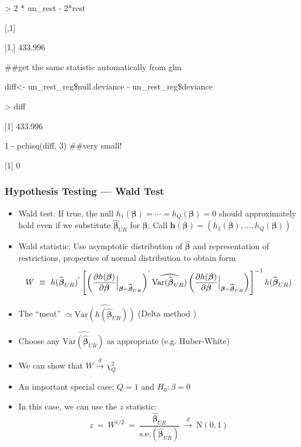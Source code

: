 \documentclass{beamer}
\begin{document}
\begin{frame}

\begin{semiverbatim}
 > 2 * un\_rest - 2*rest

\hspace{0.15in}        [,1]

[1,] 433.996

 \#\#get the same statistic automatically from glm

 diff<- un\_rest\_reg\$null.deviance - un\_rest\_reg\$deviance

> diff

[1] 433.996


 1 - pchisq(diff, 3) \#\#very small!

[1] 0

\end{semiverbatim}


\end{frame}


\begin{frame}
\frametitle{Hypothesis Testing --- Wald Test}
\begin{itemize}[<+->]
\item \alert{Wald test}: If true, the null $h_1(\boldsymbol{\beta})=\cdots =h_Q(\boldsymbol{\beta})=0$
should approximately hold even if we substitute $\widehat{\boldsymbol{\beta}}_{UR}$ for $\boldsymbol{\beta}$.  Call $\boldsymbol{h}(\boldsymbol{\beta}) = \left(h_{1} (\boldsymbol{\beta}), \hdots, h_{Q}(\boldsymbol{\beta}) \right)$
\item Wald statistic: Use asymptotic distribution of $\widehat{\boldsymbol{\beta}}$ and representation of restrictions, properties of normal distribution to obtain form
{\small
    $$ W \ \equiv \ h(\widehat{\boldsymbol{\beta}}_{UR})^{'} \left[\left(\frac{\partial h(\boldsymbol{\beta})}
    {\partial \boldsymbol{\beta}}\Bigl|_{\boldsymbol{\beta}=\widehat{\boldsymbol{\beta}}_{UR}} \right)^{'}
    \widehat{\text{Var}(\widehat{\boldsymbol{\beta}}_{UR})}
    \left(\frac{\partial h(\boldsymbol{\beta})}{\partial\boldsymbol{\beta}}\Bigl|_{\boldsymbol{\beta}=\widehat{\boldsymbol{\beta}}_{UR}}\right)\right]^{-1}
    h(\widehat{\boldsymbol{\beta}}_{UR})$$
}

\item The ``meat'' $\simeq \widehat{\text{Var}(h(\widehat{\boldsymbol{\beta}}_{UR}))}$
(\alert{Delta method} )
\item Choose any $\widehat{\text{Var}(\widehat{\boldsymbol{\beta}}_{UR})}$ as appropriate (e.g. Huber-White)
\item We can show that $W \stackrel{d}{\longrightarrow} \chi_Q^2$
\bigskip
\item An important special case: $Q=1$ and $H_0: \beta = 0$
\item In this case, we can use the \alert{$z$ statistic}:
{\small
$$ z \ = \ W^{1/2} \ = \ \frac{\widehat{\boldsymbol{\beta}}_{UR}}{\text{s.e.}(\widehat{\boldsymbol{\beta}}_{UR})}
 \ \stackrel{d}{\longrightarrow} \ \text{N}(0,1)$$
}
\end{itemize}

\end{frame}
\end{document}

